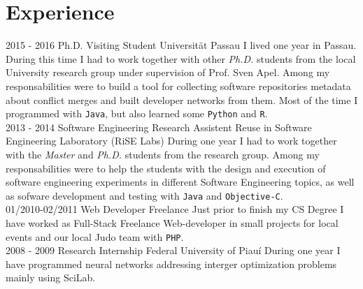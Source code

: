 \documentclass[]{friggeri-cv}
\begin{document}
\section{Experience}
\begin{entrylist}
    \entry
    {2015 - 2016}
    {Ph.D. Visiting Student}
    {Universit\"at Passau}
    {I lived one year in Passau. During this time I had to work together with other \textit{Ph.D.} students from the local University research group under supervision of Prof. Sven Apel. Among my responsabilities were to build a tool for collecting software repositories metadata about conflict merges and built developer networks from them. Most of the time I programmed with \texttt{Java}, but also learned some \texttt{Python} and \texttt{R}. \\}
  \entry
    {2013 - 2014}
    {Software Engineering Research Assistent}
    {Reuse in Software Engineering Laboratory (RiSE Labs)}
    {During one year I had to work together with the \textit{Master} and \textit{Ph.D.} students from the research group. Among my responsabilities were to help the students with the design and execution of software engineering experiments in different Software Engineering topics, as well as sofware development and testing with \texttt{Java} and \texttt{Objective-C}. \\}
  \entry
    {01/2010-02/2011}
    {Web Developer}
    {Freelance}
    {Just prior to finish my CS Degree I have worked as Full-Stack Freelance Web-developer in small projects for local events and our local Judo team with \texttt{PHP}.\\}
    \entry
    {2008 - 2009}
    {Research Internship}
    {Federal University of Piauí}
    {During one year I have programmed neural networks addressing interger optimization problems mainly using SciLab.}
   
\end{entrylist}



\newpage
\end{document}
